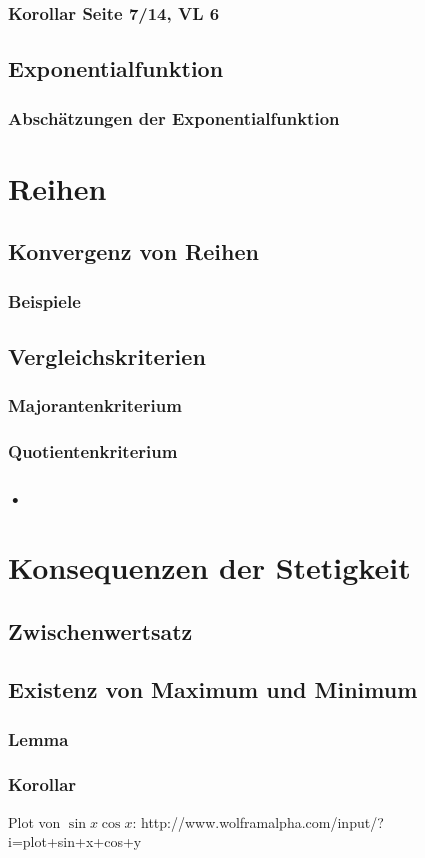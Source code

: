 \documentclass[10pt,a4paper^, twocolumn]{article}
\begin{document}
\subsubsection{Korollar Seite 7/14, VL 6}
\subsection{Exponentialfunktion}
\subsubsection{Abschätzungen der Exponentialfunktion}

\section{Reihen}
\subsection{Konvergenz von Reihen}
\subsubsection{Beispiele}
\subsection{Vergleichskriterien}
\subsubsection{Majorantenkriterium}
\subsubsection{Quotientenkriterium}
\subsubsection{•}

\section{Konsequenzen der Stetigkeit}
\subsection{Zwischenwertsatz} 
\subsection{Existenz von Maximum und Minimum}
\subsubsection{Lemma}
\subsubsection{Korollar}


Plot von $\sin x \cos x$: http://www.wolframalpha.com/input/?i=plot+sin+x+cos+y





%
%
%
%
%
%
%
%
\end{document}
